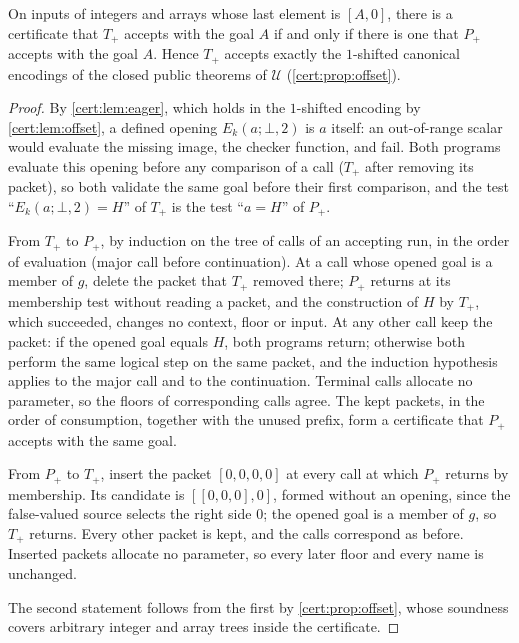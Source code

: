 \begin{theorem}\label{cert:thm:shifted-terminal}
On inputs of integers and arrays whose last element is $[A,0]$, there is a
certificate that $T_{+}$ accepts with the goal $A$ if and only if there is one
that $P_{+}$ accepts with the goal $A$. Hence $T_{+}$ accepts exactly the
$1$-shifted canonical encodings of the closed public theorems of $\mathcal U$
(\cref{cert:prop:offset}).
\end{theorem}
\begin{proof}
By \cref{cert:lem:eager}, which holds in the $1$-shifted encoding by
\cref{cert:lem:offset}, a defined opening $E_k(a;\bot,2)$ is $a$ itself: an
out-of-range scalar would evaluate the missing image, the checker function, and
fail. Both programs evaluate this opening before any comparison of a call ($T_{+}$
after removing its packet), so both validate the same goal before their first
comparison, and the test
``$E_k(a;\bot,2)=H$'' of $T_{+}$ is the test ``$a=H$'' of $P_{+}$.

From $T_{+}$ to $P_{+}$, by induction on the tree of calls of an accepting run,
in the order of evaluation (major call before continuation). At a call whose
opened goal is a member of $g$, delete the packet that $T_{+}$ removed there;
$P_{+}$ returns at its membership test without reading a packet, and the
construction of $H$ by $T_{+}$, which succeeded, changes no context, floor or
input. At any other call keep the packet: if the opened goal equals $H$, both
programs return; otherwise both perform the same logical step on the same packet,
and the induction hypothesis applies to the major call and to the continuation.
Terminal calls allocate no parameter, so the floors of corresponding calls agree.
The kept packets, in the order of consumption, together with the unused prefix,
form a certificate that $P_{+}$ accepts with the same goal.

From $P_{+}$ to $T_{+}$, insert the packet $[0,0,0,0]$ at every call at which
$P_{+}$ returns by membership. Its candidate is $[[0,0,0],0]$, formed without an
opening, since the false-valued source selects the right side $0$; the opened
goal is a member of $g$, so $T_{+}$ returns. Every other packet is kept, and the
calls correspond as before. Inserted packets allocate no parameter, so every
later floor and every name is unchanged.

The second statement follows from the first by \cref{cert:prop:offset}, whose
soundness covers arbitrary integer and array trees inside the certificate.
\end{proof}


